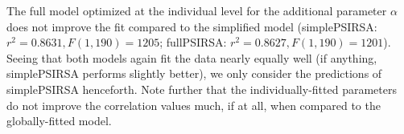 \documentclass[11pt,a4paper]{article}
\newcommand{\gcs}[1]{\textcolor{blue}{[gcs: #1]}}
\begin{document}
The full model optimized at the individual level for the additional parameter $\alpha$ does not improve the fit compared to the simplified model (simplePSIRSA: $r^{2}=0.8631, F(1,190) = 1205$; fullPSIRSA: $r^{2}=0.8627, F(1,190) = 1201$). 
Seeing that both models again fit the data nearly equally well (if anything, simplePSIRSA performs slightly better), we only consider the predictions of simplePSIRSA henceforth.
Note further that the individually-fitted parameters do not improve the correlation values much, if at all, when compared to the globally-fitted model. 







\end{document}
